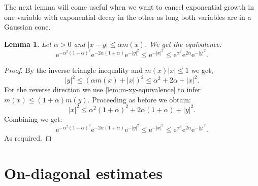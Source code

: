 \documentclass[a4paper,oneside,10pt]{amsproc}
\newtheorem{lemma}{Lemma}
\theoremstyle{remark}
\renewcommand{\leq}{\leqslant}
\renewcommand{\leq}{\leqslant}
\newcommand{\e}{\mathrm{e}} %
\renewcommand{\leq}{\leqslant}%
\begin{document}
The next lemma will come useful when we want to cancel exponential
growth in one variable with exponential decay in the other as long
both variables are in a Gaussian cone.
\begin{lemma}\label{lem:Cone-Gaussians-comparable}
  Let $\alpha > 0$ and $|x - y| \leq \alpha m(x)$. We get the
  equivalence:
  \begin{equation*}
    \e^{-\alpha^2(1 + \alpha)^2} \e^{-2\alpha(1 + \alpha)} \e^{-|y|^2}
    \leq \e^{-|x|^2} \leq \e^{\alpha^2} \e^{2\alpha} \e^{-|y|^2}.
  \end{equation*}
\end{lemma}
\begin{proof}
  By the inverse triangle inequality and $m(x)|x| \leq 1$ we get, 
  \begin{equation}
    |y|^2 \leq (\alpha m(x) + |x|)^2 \leq \alpha^2 + 2 \alpha + |x|^2.
  \end{equation}
  For the reverse direction we use
  \autoref{lem:m-xy-equivalence} to infer $m(x) \leq (1 + \alpha)
  m(y)$. Proceeding as before we obtain: 
  \begin{equation*}
    |x|^2 \leq \alpha^2 (1 + \alpha)^2 + 2 \alpha (1 + \alpha) + |y|^2.
  \end{equation*}
  Combining we get:
  \begin{equation}
    \label{eq:Cone-Gaussians-comparable}
    \e^{-\alpha^2(1 + \alpha)^2} \e^{-2\alpha(1 + \alpha)} \e^{-|y|^2}
    \leq \e^{-|x|^2} \leq \e^{\alpha^2} \e^{2\alpha} \e^{-|y|^2}.
  \end{equation}
  As required.
\end{proof}

\section{On-diagonal estimates}
\end{document}
